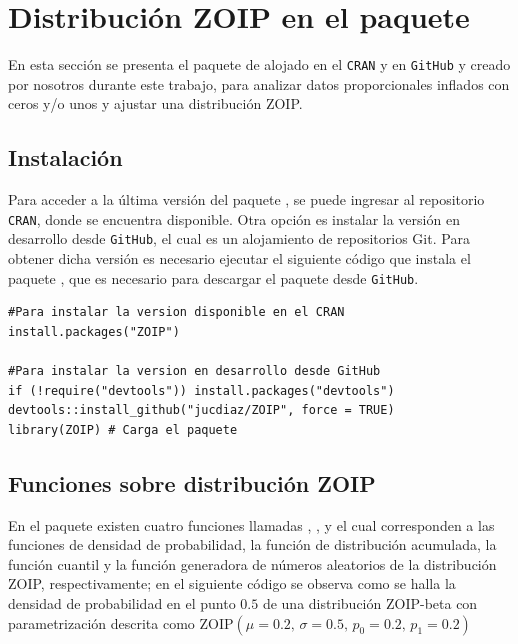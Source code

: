

\section{Distribuci\'{o}n ZOIP en el paquete }

En esta secci\'{o}n se presenta el paquete  de  alojado en el \verb|CRAN| y en \verb|GitHub| y creado por nosotros durante este trabajo, para analizar datos proporcionales inflados con ceros y/o unos y ajustar una distribuci\'{o}n ZOIP.

\subsection{Instalaci\'{o}n}

Para acceder a la \'{u}ltima versi\'{o}n del paquete , se puede ingresar al repositorio \verb|CRAN|, donde se encuentra disponible. Otra opci\'{o}n es instalar la versi\'{o}n en de\-sa\-rro\-llo desde \verb|GitHub|, el cual es un alojamiento de repositorios Git. Para obtener dicha versi\'{o}n es necesario ejecutar el siguiente c\'{o}digo que instala el paquete , que es necesario para descargar el paquete  desde \verb|GitHub|.

\begin{verbatim}
#Para instalar la version disponible en el CRAN
install.packages("ZOIP")

#Para instalar la version en desarrollo desde GitHub
if (!require("devtools")) install.packages("devtools")
devtools::install_github("jucdiaz/ZOIP", force = TRUE)
library(ZOIP) # Carga el paquete
\end{verbatim}

\subsection{Funciones sobre distribuci\'{o}n ZOIP}

En el paquete  existen cuatro funciones llamadas , ,  y  el cual corresponden a las funciones de densidad de probabilidad, la funci\'{o}n de distribuci\'{o}n acumulada, la funci\'{o}n cuantil y la funci\'{o}n generadora de n\'{u}meros aleatorios de la distribuci\'{o}n ZOIP, respectivamente; en el siguiente c\'{o}digo se observa como se halla la densidad de probabilidad en el punto $0.5$ de una distribuci\'{o}n ZOIP-beta con parametrizaci\'{o}n \cite{Stasinopoulos2} descrita como $\text{ZOIP}(\mu=0.2, \, \sigma=0.5, \, p_0=0.2, \, p_1=0.2)$\\

